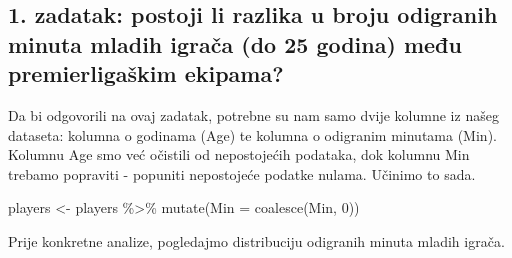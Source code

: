 \documentclass[
]{article}
\newenvironment{Shaded}{\begin{snugshade}}{\end{snugshade}}
\newcommand{\AttributeTok}[1]{\textcolor[rgb]{0.77,0.63,0.00}{#1}}
\newcommand{\CommentTok}[1]{\textcolor[rgb]{0.56,0.35,0.01}{\textit{#1}}}
\newcommand{\DecValTok}[1]{\textcolor[rgb]{0.00,0.00,0.81}{#1}}
\newcommand{\FunctionTok}[1]{\textcolor[rgb]{0.00,0.00,0.00}{#1}}
\newcommand{\NormalTok}[1]{#1}
\newcommand{\OtherTok}[1]{\textcolor[rgb]{0.56,0.35,0.01}{#1}}
\newcommand{\SpecialCharTok}[1]{\textcolor[rgb]{0.00,0.00,0.00}{#1}}
\newcommand{\StringTok}[1]{\textcolor[rgb]{0.31,0.60,0.02}{#1}}
\begin{document}
\begin{Shaded}
\end{Shaded}

\hypertarget{zadatak-postoji-li-razlika-u-broju-odigranih-minuta-mladih-igraux10da-do-25-godina-meux111u-premierligaux161kim-ekipama}{%
\subsection{1. zadatak: postoji li razlika u broju odigranih minuta
mladih igrača (do 25 godina) među premierligaškim
ekipama?}\label{zadatak-postoji-li-razlika-u-broju-odigranih-minuta-mladih-igraux10da-do-25-godina-meux111u-premierligaux161kim-ekipama}}

Da bi odgovorili na ovaj zadatak, potrebne su nam samo dvije kolumne iz
našeg dataseta: kolumna o godinama (Age) te kolumna o odigranim minutama
(Min). Kolumnu Age smo već očistili od nepostojećih podataka, dok
kolumnu Min trebamo popraviti - popuniti nepostojeće podatke nulama.
Učinimo to sada.

\begin{Shaded}
\begin{Highlighting}[]
\NormalTok{players }\OtherTok{\textless{}{-}}\NormalTok{ players }\SpecialCharTok{\%\textgreater{}\%} \FunctionTok{mutate}\NormalTok{(}\AttributeTok{Min =} \FunctionTok{coalesce}\NormalTok{(Min, }\DecValTok{0}\NormalTok{))}
\end{Highlighting}
\end{Shaded}

Prije konkretne analize, pogledajmo distribuciju odigranih minuta mladih
igrača.

\begin{Shaded}
\end{Shaded}
\end{document}
